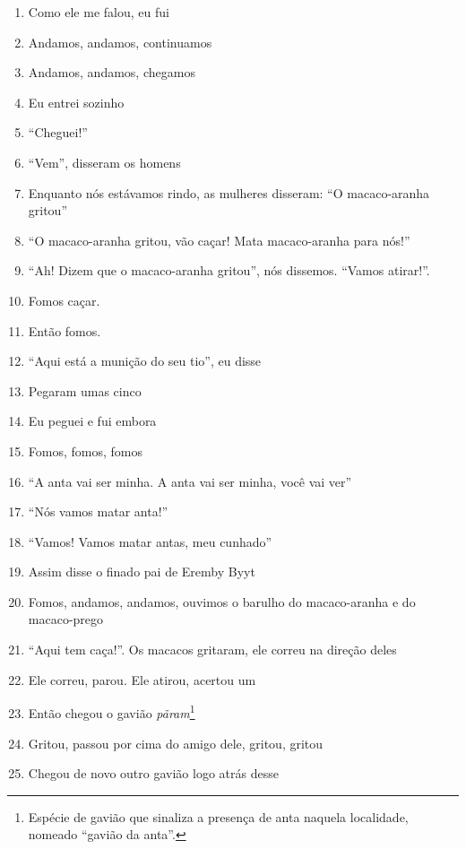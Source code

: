 \begin{enumerate}
 \item Como ele me falou, eu fui
 \begin{center}\end{center}
 \item Andamos, andamos, continuamos
 \item Andamos, andamos, chegamos
 \item Eu entrei sozinho
 \item ``Cheguei!''
 \item ``Vem'', disseram os homens
 \item Enquanto nós estávamos rindo, as mulheres disseram: ``O macaco-aranha gritou''
 \item ``O macaco-aranha gritou, vão caçar! Mata macaco-aranha para nós!''
 \item ``Ah! Dizem que o macaco-aranha gritou'', nós dissemos. ``Vamos atirar!''.
 \item Fomos caçar.
 \item Então fomos.
 \item ``Aqui está a munição do seu tio'', eu disse
 \item Pegaram umas cinco
 \item Eu peguei e fui embora
 \begin{center}\end{center}
 \item Fomos, fomos, fomos
 \item ``A anta vai ser minha. A anta vai ser minha, você vai ver''
 \item ``Nós vamos matar anta!''
 \item ``Vamos! Vamos matar antas, meu cunhado''
 \item Assim disse o finado pai de Eremby Byyt
 \item Fomos, andamos, andamos, ouvimos o barulho do macaco-aranha e do
 macaco-prego
 \item ``Aqui tem caça!''. Os macacos gritaram, ele correu na direção deles
 \item Ele correu, parou. Ele atirou, acertou um
 \begin{center}\end{center}
 \item Então chegou o gavião \textit{pãram}\footnote{Espécie de gavião que
   sinaliza a presença de anta naquela localidade, nomeado ``gavião da
   anta''.}
 \item Gritou, passou por cima do amigo dele, gritou, gritou
 \item Chegou de novo outro gavião logo atrás desse

\end{enumerate}
